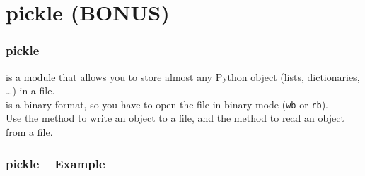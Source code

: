 \documentclass{beamer}
\begin{document}
\section{pickle (BONUS)}
\begin{frame}
  \frametitle{pickle}
  \texttt{} is a module that allows you to store almost any Python object (lists, dictionaries, \dots) in a file.\\
  \vspace{5mm}
  \texttt{} is a binary format, so you have to open the file in binary mode (\texttt{wb} or \texttt{rb}).\\
  \vspace{5mm}
  Use the \texttt{} method to write an object to a file, and the \texttt{} method to read an object from a file.
\end{frame}
\begin{frame}
  \frametitle{pickle -- Example}
  
\end{frame}
\end{document}
